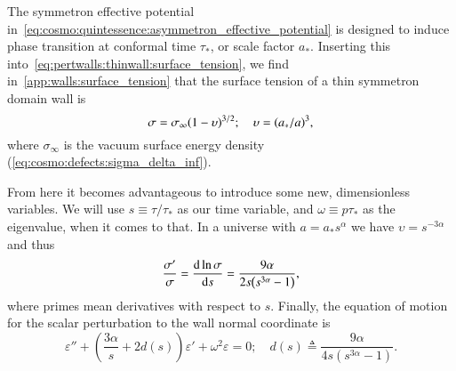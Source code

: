 




\newcommand{\eqregimenum}{\ALIASeqregimenum}






The symmetron effective potential in~\cref{eq:cosmo:quintessence:asymmetron_effective_potential} is designed to induce phase transition at conformal time $\tau_\ast$, or scale factor $a_\ast$. Inserting this into~\cref{eq:pertwalls:thinwall:surface_tension}, we find in~\cref{app:walls:surface_tension} that the surface tension of a thin symmetron domain wall is
\begin{equation}
    \sigma = \sigma_\infty {\left( 1 -\upsilon  \right)}^{3/2}; \quad \upsilon={\left( a_\ast/a \right)}^3,
\end{equation}
where $\sigma_\infty$ is the vacuum surface energy density (\cref{eq:cosmo:defects:sigma_delta_inf}). 

From here it becomes advantageous to introduce some new, dimensionless variables. %
We will use $s\equiv \tau/\tau_\ast$ as our time variable, and $\omega \equiv p\tau_\ast$ as the eigenvalue, when it comes to that. In a universe with $a = a_\ast s^\alpha$ we have $\upsilon = s^{-3\alpha}$ and thus  %
\begin{equation}
    \frac{\sigma '}{\sigma} 
    = \dv{\ln{\sigma}}{s} = \frac{9\alpha}{2s{\left( s^{3\alpha} -1  \right)}},
\end{equation}
where primes mean derivatives with respect to $s$. %
Finally, the equation of motion for the scalar perturbation to the wall normal coordinate is
\begin{equation}\label{eq:pertwalls:mywalls:eom_final}
    \varepsilon'' + \left(  \frac{3\alpha}{s}  + 2 d(s)\right)\varepsilon' + \omega^2\varepsilon = 0; \quad d(s)\triangleq \frac{9\alpha}{4 s \left( s^{3\alpha}-1 \right)}.
\end{equation}


